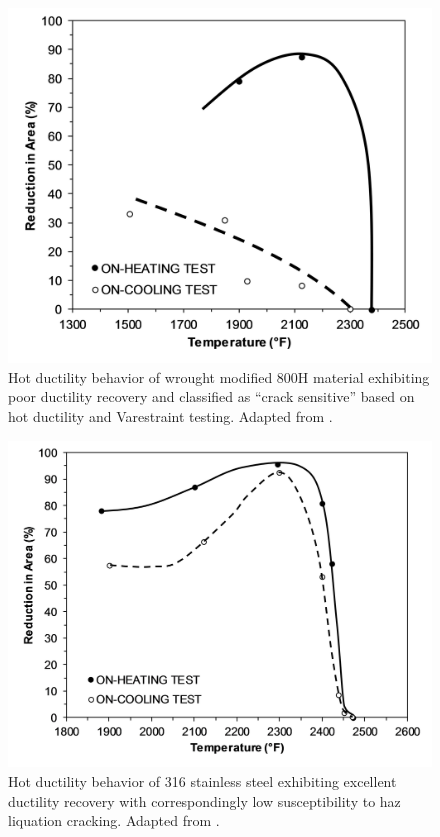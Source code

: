 {\begin{figure}
    \centering
    \includegraphics{figures/qiao-hot-ductility-800h-susceptible-r1.png}
    \caption[Hot ductility behavior of wrought modified 800H material exhibiting poor ductility recovery.]{Hot ductility behavior of wrought modified 800H material exhibiting poor ductility recovery and classified as ``crack sensitive'' based on hot ductility and Varestraint testing. Adapted from \citet{qiao_weldability_1993}.}
    \label{fig:qiao-hot-ductility-800h-susceptible}
\end{figure}

\begin{figure}
    \centering
    \includegraphics{figures/qiao-hot-ductility-ref-316-r1.png}
    \caption[Hot ductility behavior of 316 stainless steel exhibiting excellent ductility recovery.]{Hot ductility behavior of 316 stainless steel exhibiting excellent ductility recovery with correspondingly low susceptibility to \gls{haz} liquation cracking. Adapted from \citet{qiao_weldability_1993}.}
    \label{fig:qiao-hot-ductility-316}
\end{figure}

}
